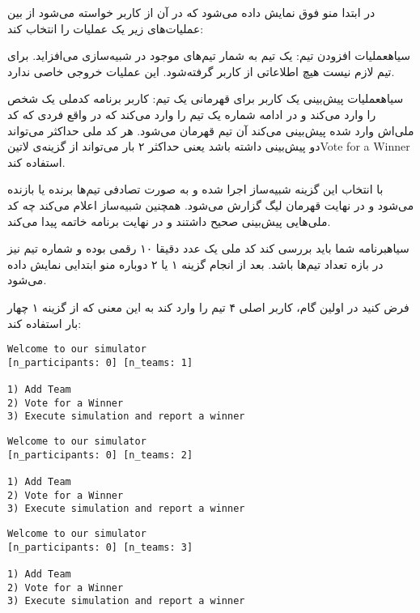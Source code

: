 در ابتدا منو فوق نمایش داده می‌شود
که در آن از کاربر خواسته می‌شود از بین عملیات‌های زیر یک عملیات را انتخاب کند:

 ‌سیاه{عملیات افزودن تیم}: یک تیم به شمار تیم‌های موجود در شبیه‌سازی می‌افزاید.
    برای تیم لازم نیست هیچ اطلاعاتی از کاربر گرفته‌شود. این عملیات خروجی خاصی ندارد.

 ‌سیاه{عملیات پیش‌بینی یک کاربر برای قهرمانی یک تیم}:
    کاربر برنامه کدملی یک شخص را وارد می‌کند و در ادامه شماره یک تیم را وارد می‌کند
    که در واقع فردی که کد ملی‌اش وارد شده پیش‌بینی می‌کند آن تیم قهرمان می‌شود.
    هر کد ملی حداکثر می‌تواند دو پیش‌بینی داشته باشد
    یعنی حداکثر ۲ بار می‌تواند از گزینه‌ی
    ‌لاتین{Vote for a Winner}
    استفاده کند.

 با انتخاب این گزینه شبیه‌ساز اجرا شده و به صورت تصادفی تیم‌ها برنده یا بازنده می‌شود
    و در نهایت قهرمان لیگ گزارش می‌شود.
    همچنین شبیه‌ساز اعلام می‌کند چه کد ملی‌هایی پیش‌بینی صحیح داشتند و در نهایت برنامه خاتمه پیدا می‌کند.

‌سیاه{برنامه شما باید بررسی کند کد ملی یک عدد دقیقا ۱۰ رقمی بوده و شماره تیم نیز در بازه تعداد تیم‌ها باشد}.
بعد از انجام گزینه ۱ یا ۲ دوباره منو ابتدایی نمایش داده می‌شود.


فرض کنید در اولین گام، کاربر اصلی ۴ تیم را وارد کند به این معنی که از گزینه ۱ چهار بار استفاده کند:

\begin{latin}
\begin{verbatim}
Welcome to our simulator
[n_participants: 0] [n_teams: 1]

1) Add Team
2) Vote for a Winner
3) Execute simulation and report a winner
\end{verbatim}
\end{latin}


\begin{latin}
\begin{verbatim}
Welcome to our simulator
[n_participants: 0] [n_teams: 2]

1) Add Team
2) Vote for a Winner
3) Execute simulation and report a winner
\end{verbatim}
\end{latin}

\begin{latin}
\begin{verbatim}
Welcome to our simulator
[n_participants: 0] [n_teams: 3]

1) Add Team
2) Vote for a Winner
3) Execute simulation and report a winner
\end{verbatim}
\end{latin}

